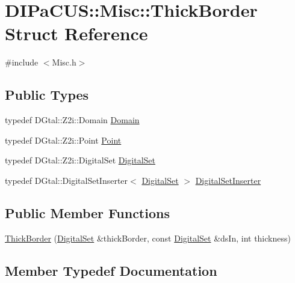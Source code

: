 \hypertarget{structDIPaCUS_1_1Misc_1_1ThickBorder}{}\section{D\+I\+Pa\+C\+US\+:\+:Misc\+:\+:Thick\+Border Struct Reference}
\label{structDIPaCUS_1_1Misc_1_1ThickBorder}


{\ttfamily \#include $<$Misc.\+h$>$}

\subsection*{Public Types}
\begin{DoxyCompactItemize}
\item 
typedef D\+Gtal\+::\+Z2i\+::\+Domain \hyperlink{structDIPaCUS_1_1Misc_1_1ThickBorder_a06c1111877ee915840d29a376650fcb2}{Domain}
\item 
typedef D\+Gtal\+::\+Z2i\+::\+Point \hyperlink{structDIPaCUS_1_1Misc_1_1ThickBorder_ae295c13d112a91997154ec08edcbd01d}{Point}
\item 
typedef D\+Gtal\+::\+Z2i\+::\+Digital\+Set \hyperlink{structDIPaCUS_1_1Misc_1_1ThickBorder_a0fc2e5498fb6c524bebb4965338a9189}{Digital\+Set}
\item 
typedef D\+Gtal\+::\+Digital\+Set\+Inserter$<$ \hyperlink{structDIPaCUS_1_1Misc_1_1ThickBorder_a0fc2e5498fb6c524bebb4965338a9189}{Digital\+Set} $>$ \hyperlink{structDIPaCUS_1_1Misc_1_1ThickBorder_ae6b153aee7b5ce2c7aa5031fb2e237ea}{Digital\+Set\+Inserter}
\end{DoxyCompactItemize}
\subsection*{Public Member Functions}
\begin{DoxyCompactItemize}
\item 
\hyperlink{structDIPaCUS_1_1Misc_1_1ThickBorder_aab612b502416009a6ae33d36830de1d6}{Thick\+Border} (\hyperlink{structDIPaCUS_1_1Misc_1_1ThickBorder_a0fc2e5498fb6c524bebb4965338a9189}{Digital\+Set} \&thick\+Border, const \hyperlink{structDIPaCUS_1_1Misc_1_1ThickBorder_a0fc2e5498fb6c524bebb4965338a9189}{Digital\+Set} \&ds\+In, int thickness)
\end{DoxyCompactItemize}


\subsection{Member Typedef Documentation}
\mbox{\label{structDIPaCUS_1_1Misc_1_1ThickBorder_a0fc2e5498fb6c524bebb4965338a9189}} 
